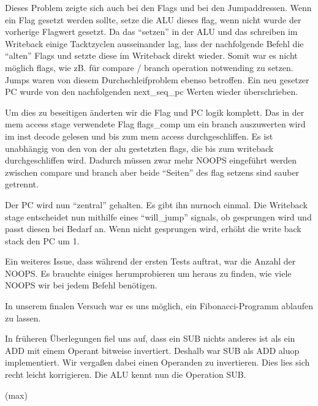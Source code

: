 \documentclass[paper=a4,fontsize=12pt,twocolumn]{scrreprt}
\begin{document}
Dieses Problem zeigte sich auch bei den Flags und bei den Jumpaddressen.
Wenn ein Flag gesetzt werden sollte, setze die ALU dieses flag, wenn nicht wurde der vorherige Flagwert gesetzt.
Da das \enquote{setzen} in der ALU und das schreiben im Writeback einige Tacktzyclen ausseinander lag, lass der nachfolgende Befehl die \enquote{alten} Flags und setzte diese im Writeback direkt wieder.
Somit war es nicht möglich flags, wie zB. für compare / branch operation notwending zu setzen.
Jumps waren von diesem Durchschleifproblem ebenso betroffen. Ein neu gesetzer PC wurde von den nachfolgenden next\_seq\_pc Werten wieder überschrieben.

Um dies zu beseitigen änderten wir die Flag und PC logik komplett.
Das in der mem access stage verwendete Flag flags\_comp um ein branch auszuwerten wird im inst decode gelesen und bis zum mem access durchgeschliffen.
Es ist unabhängig von den von der alu gestetzten flags, die bis zum writeback durchgeschliffen wird.
Dadurch müssen zwar mehr NOOPS eingeführt werden zwischen compare und branch aber beide \enquote{Seiten} des flag setzens sind sauber getrennt.

Der PC wird nun \enquote{zentral} gehalten.
Es gibt ihn nurnoch einmal.
Die Writeback stage entscheidet nun mithilfe eines \enquote{will\_jump} signals, ob gesprungen wird und passt diesen bei Bedarf an.
Wenn nicht gesprungen wird, erhöht die write back stack den PC um 1.

Ein weiteres Issue, dass während der ersten Tests auftrat, war die Anzahl der NOOPS.
Es brauchte einiges herumprobieren um heraus zu finden, wie viele NOOPS wir bei jedem Befehl benötigen.

In unserem finalen Versuch war es uns möglich, ein Fibonacci-Programm ablaufen zu lassen.

In früheren Überlegungen fiel uns auf, dass ein SUB nichts anderes ist als ein ADD mit einem Operant bitweise invertiert.
Deshalb war SUB als ADD aluop implementiert.
Wir vergaßen dabei einen Operanden zu invertieren.
Dies lies sich recht leicht korrigieren.
Die ALU kennt nun die Operation SUB.

(max)
\end{document}
